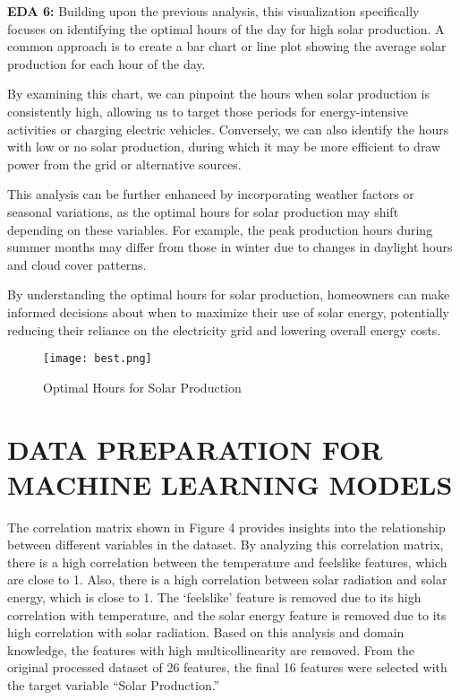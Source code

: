 \documentclass[conference]{IEEEtran}
\begin{document}
\textbf{EDA 6:} Building upon the previous analysis, this visualization specifically focuses on identifying the optimal hours of the day for high solar production. A common approach is to create a bar chart or line plot showing the average solar production for each hour of the day.

By examining this chart, we can pinpoint the hours when solar production is consistently high, allowing us to target those periods for energy-intensive activities or charging electric vehicles. Conversely, we can also identify the hours with low or no solar production, during which it may be more efficient to draw power from the grid or alternative sources.

This analysis can be further enhanced by incorporating weather factors or seasonal variations, as the optimal hours for solar production may shift depending on these variables. For example, the peak production hours during summer months may differ from those in winter due to changes in daylight hours and cloud cover patterns.

By understanding the optimal hours for solar production, homeowners can make informed decisions about when to maximize their use of solar energy, potentially reducing their reliance on the electricity grid and lowering overall energy costs.
\begin{figure}[H] %
    \centering
    \texttt{[image: best.png]}
    \caption{Optimal Hours for Solar Production}
    \label{fig:technical_workflow}
\end{figure}
\section{DATA PREPARATION FOR MACHINE LEARNING MODELS}
The correlation matrix shown in Figure 4 provides insights into the relationship between different variables in the dataset. By analyzing this correlation matrix, there is a high correlation between the temperature and feelslike features, which are close to 1. Also, there is a high correlation between solar radiation and solar energy, which is close to 1. The ‘feelslike’ feature is removed due to its high correlation with temperature, and the solar energy feature is removed due to its high correlation with solar radiation. Based on this analysis and domain knowledge, the features with high multicollinearity are removed. From the original processed dataset of 26 features, the final 16 features were selected with the target variable “Solar Production.” 
\end{document}
